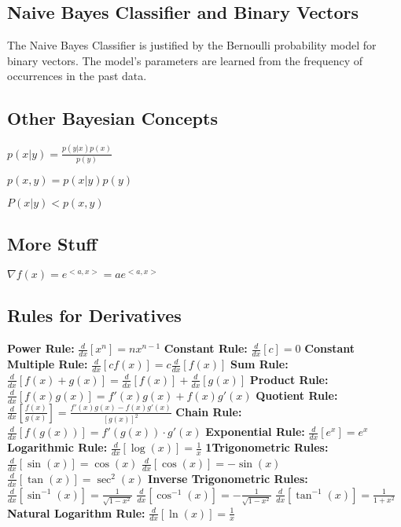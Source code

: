 \documentclass[10pt]{article}
\begin{document}
\begin{multicols}{2}
\subsection*{Naive Bayes Classifier and Binary Vectors}
The Naive Bayes Classifier is justified by the Bernoulli probability model for binary vectors. The model's parameters are learned from the frequency of occurrences in the past data.
\subsection*{Other Bayesian Concepts}
$p(x|y) = \frac{p(y|x)p(x)}{p(y)}$

$p(x,y) = p(x|y)p(y)$

$P(x|y) < p(x,y)$
\subsection*{More Stuff}
$\nabla f(x) = e^{<a, x>} = a e^{<a, x>}$

\subsection*{Rules for Derivatives}
\textbf{Power Rule:}
$
\frac{d}{dx} [x^n] = n x^{n-1}
$
\textbf{Constant Rule:}
$
\frac{d}{dx} [c] = 0
$
\textbf{Constant Multiple Rule:}
$
\frac{d}{dx} [c f(x)] = c \frac{d}{dx} [f(x)]
$
\textbf{Sum Rule:}
$
\frac{d}{dx} [f(x) + g(x)] = \frac{d}{dx} [f(x)] + \frac{d}{dx} [g(x)]
$
\textbf{Product Rule:}
$
\frac{d}{dx} [f(x) g(x)] = f'(x) g(x) + f(x) g'(x)
$
\textbf{Quotient Rule:}
$
\frac{d}{dx} \left[ \frac{f(x)}{g(x)} \right] = \frac{f'(x) g(x) - f(x) g'(x)}{[g(x)]^2}
$
\textbf{Chain Rule:}
$
\frac{d}{dx} [f(g(x))] = f'(g(x)) \cdot g'(x)
$
\textbf{Exponential Rule:}
$
\frac{d}{dx} [e^x] = e^x
$
\textbf{Logarithmic Rule:}
$
\frac{d}{dx} [\log(x)] = \frac{1}{x}
$
\textbf{1Trigonometric Rules:}
$
\frac{d}{dx} [\sin(x)] = \cos(x)
$
$
\frac{d}{dx} [\cos(x)] = -\sin(x)
$
$
\frac{d}{dx} [\tan(x)] = \sec^2(x)
$
\textbf{Inverse Trigonometric Rules:}
$
\frac{d}{dx} [\sin^{-1}(x)] = \frac{1}{\sqrt{1 - x^2}}
$
$
\frac{d}{dx} [\cos^{-1}(x)] = -\frac{1}{\sqrt{1 - x^2}}
$
$
\frac{d}{dx} [\tan^{-1}(x)] = \frac{1}{1 + x^2}
$
\textbf{Natural Logarithm Rule:}
$\frac{d}{dx} [\ln(x)] = \frac{1}{x}$

\end{multicols}
\end{document}
